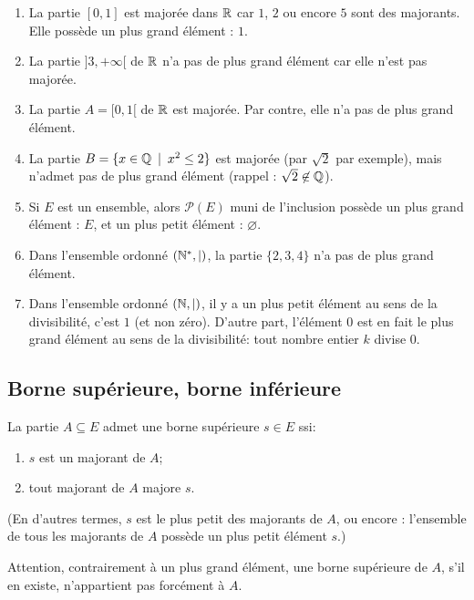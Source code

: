 \begin{exemples}
\begin{enumerate}[label=\alph*)]
\item  La partie $[0,1]$ est majorée dans $\mathbb{R}$ car $1$, $2$ ou encore $5$ sont des majorants. Elle possède un plus grand élément : $1$.
\item La partie $]3,+\infty[$ de $\mathbb{R}$ n'a pas de plus grand élément car elle n'est pas majorée.
\item La partie $A=[0,1[$ de $\mathbb{R}$ est majorée. Par contre, elle n'a pas de plus grand élément. 
\item La partie $B=\{x\in \mathbb{Q}\:\mid\: x^2\leq 2\}$ est majorée (par $\sqrt2$ par exemple), mais n'admet pas de plus grand élément (rappel : $\sqrt 2 \not\in\mathbb{Q}$).
\item Si $E$ est un ensemble, alors $\mathcal P(E)$ muni de l'inclusion possède un plus grand élément : $E$, et un plus petit élément : $\varnothing$.
\item Dans l'ensemble ordonné $(\mathbb{N}^*,|)$, la partie $\{2,3,4\}$ n'a pas de plus grand élément.
\item Dans l'ensemble ordonné $(\mathbb{N},|)$, il y a un plus petit élément au sens de la divisibilité, c'est $1$ (et non zéro). D'autre part, l'élément $0$ est en fait le plus grand élément au sens de la divisibilité: tout nombre entier $k$ divise $0$.
\end{enumerate}
\end{exemples}

\subsection{Borne supérieure, borne inférieure}

\begin{definition}
 La partie $A\subseteq E$ admet une borne supérieure $s\in E$ ssi:
\begin{enumerate}
\item $s$ est un majorant de $A$;
\item tout majorant de $A$ majore $s$.
\end{enumerate}
(En d'autres termes, $s$ est le plus petit des majorants de $A$, ou encore : l'ensemble de tous les majorants de $A$ possède un plus petit élément $s$.)
\end{definition}

Attention, contrairement à un plus grand élément, une  borne supérieure de $A$, s'il en existe, n'appartient pas forcément à $A$. 

